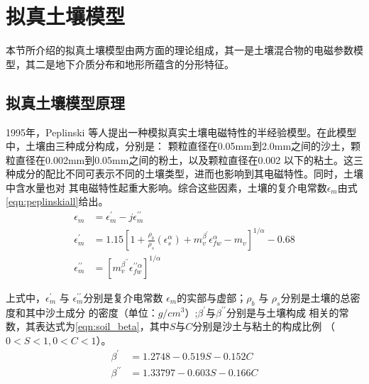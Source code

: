 \section{拟真土壤模型}
本节所介绍的拟真土壤模型由两方面的理论组成，其一是土壤混合物的电磁参数模型，其二是地下介质分布和地形所蕴含的分形特征。
\subsection{拟真土壤模型原理}
1995年，Peplinski 等人提出一种模拟真实土壤电磁特性的半经验模型。在此模型中，土壤由三种成分构成，分别是：
颗粒直径在0.05mm到2.0mm之间的沙土，颗粒直径在0.002mm到0.05mm之间的粉土，以及颗粒直径在0.002
以下的粘土。这三种成分的配比不同可表示不同的土壤类型，进而也影响到其电磁特性。同时，土壤中含水量也对
其电磁特性起重大影响。综合这些因素，土壤的复介电常数$\epsilon_m$由式\ref{eqn:peplinskiall}给出。
\begin{equation} 
	\label{eqn:peplinskiall} 
	\begin{aligned} \epsilon_{m} &=\epsilon_{m}^{\prime}-j \epsilon_{m}^{\prime \prime} \\ 
\epsilon_{m}^{\prime} &=1.15 \left[1+\frac{\rho_{b}}{\rho_{s}}\left(\epsilon_{s}^{\alpha}\right)+m_{v}^{\beta^{\prime}} \epsilon_{f w}^{\alpha}-m_{v}\right]^{1 / \alpha} - 0.68\\ 
\epsilon_{m}^{\prime \prime} &=\left[m_{v}^{\beta^{\prime \prime}} \epsilon_{f w}^{\prime \prime \alpha}\right]^{1 / \alpha} \end{aligned}
\end{equation}

上式中，$\epsilon_{m}^{\prime}$ 与 $\epsilon_{m}^{\prime \prime}$分别是复介电常数
$\epsilon_m$的实部与虚部；$\rho_{b}$ 与 $\rho_{s}$分别是土壤的总密度和其中沙土成分
的密度（单位：$g/cm^3$）;$\beta^\prime$与$\beta^{\prime \prime}$分别是与土壤构成
相关的常数，其表达式为\ref{eqn:soil_beta}，其中$S$与$C$分别是沙土与粘土的构成比例
（$0<S<1, 0<C<1$）。
\begin{equation} 
	\label{eqn:soil_beta}
	\begin{aligned}
\beta^{\prime}&=1.2748-0.519 S-0.152 C \\
\beta^{\prime \prime}&=1.33797-0.603 S-0.166 C
	\end{aligned}
\end{equation}

